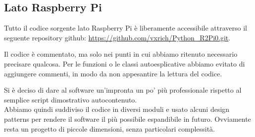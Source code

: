 \documentclass[12pt]{article}
\newcommand{\raspi}{Raspberry Pi}
\begin{document}
\subsection{Lato \raspi}

Tutto il codice sorgente lato \raspi{} è liberamente accessibile attraverso il seguente repository github: \url{https://github.com/vxrich/Python_R2Pi0.git}.

Il codice è commentato, ma solo nei punti in cui abbiamo ritenuto necessario precisare qualcosa. Per le funzioni o le classi autoesplicative abbiamo evitato di aggiungere commenti, in modo da non appesantire la lettura del codice.

Si è deciso di dare al software un'impronta un po' più professionale rispetto al semplice script dimostrativo autocontenuto.\\
Abbiamo quindi suddiviso il codice in diversi moduli e usato alcuni design patterns per rendere il software il più possibile espandibile in futuro. Ovviamente resta un progetto di piccole dimensioni, senza particolari complessità.
\end{document}
